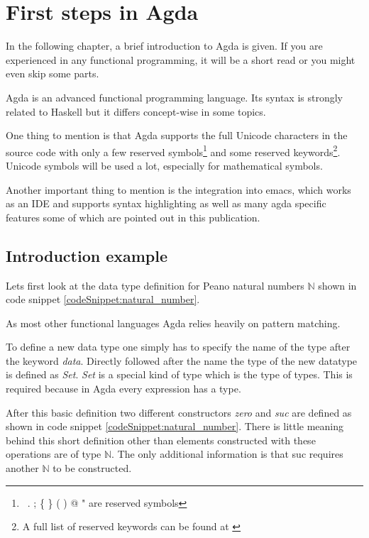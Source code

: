 \section{First steps in Agda}\label{section:first_steps_in_agda}
In the following chapter, a brief introduction to Agda is given. If you are experienced in any functional programming, it will be a short read or you might even skip some parts.

Agda is an advanced functional programming language. Its syntax is strongly related to Haskell but it differs concept-wise in some topics. 

One thing to mention is that Agda supports the full Unicode characters in the source code with only a few reserved symbols\footnote{\, . ; \{ \} ( ) @ " are reserved symbols\cite{AgdaReadTheDocsStructure}} 
and some reserved keywords\footnote{A full list of reserved keywords can be found at \cite{AgdaReadTheDocsStructure}}. 
Unicode symbols will be used a lot, especially for mathematical symbols.

Another important thing to mention is the integration into emacs, which works as an IDE and supports syntax highlighting as well as many agda specific features some of which are pointed out in this publication.

\subsection{Introduction example}\label{section:agda_introduction_example}
Lets first look at the data type definition for Peano natural numbers $\mathbb{N}$ shown in code snippet \ref{codeSnippet:natural_number}.

As most other functional languages Agda relies heavily on pattern matching. 

To define a new data type one simply has to specify the name of the type after the keyword \emph{data}. 
Directly followed after the name the type of the new datatype is defined as \emph{Set}. 
\emph{Set} is a special kind of type which is the type of types. This is required because in Agda every expression has a type\cite{norell:deptyped}.

After this basic definition two different constructors \emph{zero} and \emph{suc} are defined as shown in code snippet \ref{codeSnippet:natural_number}.
There is little meaning behind this short definition other than elements constructed with these operations are of type $\mathbb{N}$.
The only additional information is that suc requires another $\mathbb{N}$ to be constructed.

